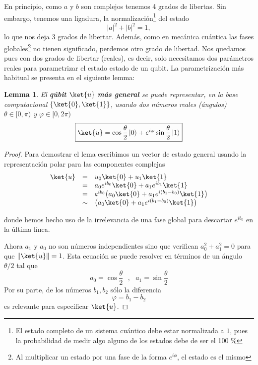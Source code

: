 \documentclass[a4paper,11pt]{book} %
\newtheorem{lemma_contador}{Lemma}
\newcommand{\Lemma}[1]{
		\begin{mybox_gray2}{}
			\begin{lemma_contador}
				 #1 
			\end{lemma_contador} 
		\end{mybox_gray2}
	}
\numberwithin{equation}{chapter}
\begin{document}
En principio, como $a$ y $b$ son complejos tenemos 4 grados de libertas. Sin embargo, tenemos una ligadura, la normalización\footnote{El estado completo de un sistema cuántico debe estar normalizada a $1$, pues la probabilidad de medir algo alguno de los estados debe de ser el 100 \%} del estado
	\begin{equation}
	|a|^2 + |b|^2 = 1,
	\end{equation}
lo que nos deja 3 grados de libertar. Además, como en mecánica cuántica las fases globales\footnote{Al multiplicar un estado por una fase de la forma $e^{i \phi}$, el estado es el mismo} no tienen significado, perdemos otro grado de libertad. Nos quedamos pues con dos grados de libertar (reales), es decir, solo necesitamos dos parámetros reales para parametrizar el estado estado de un qubit. La parametrización más habitual se presenta en el siguiente lemma:

	\Lemma{
	El \textbf{qúbit} $\ket{u}$  \textbf{más general} se puede representar, en la base computacional 
	$\{\ket{0},\ket{1}\}$, usando dos números reales (ángulos) $\theta\in [0,\pi)$ y $\varphi\in [0,2\pi)$   
	\begin{equation} \label{ec_qubit_caso_general}
	\boxed{\ket{u} = \cos{\frac{\theta}{2}}\, |0\rangle + e^{i\varphi}\sin{\frac{\theta}{2}}\,|1\rangle }
	\end{equation}
	}

	\begin{proof}
	Para demostrar el lema escribimos un vector de estado general usando la representación polar para 
	las componentes complejas
    $$
	\begin{array}{rcl}
	\ket{u} &=& u_0\ket{0} + u_1\ket{1} \\
	&=& a_0 e^{i b_0}\ket{0} + a_1 e^{ib_1}\ket{1}\\
	&=& e^{i b_0}\big(a_0 \ket{0} + a_1 e^{i(b_1-b_0)}\ket{1}\big)\\
	&\sim & \big( a_0 \ket{0} + a_1 e^{i(b_1-b_0)}\ket{1} \big)
	\end{array}
	$$
    
	donde hemos hecho uso de la irrelevancia de una fase global para descartar $e^{i b_0}$ en la última línea.

	Ahora $a_1$ y $a_0$ no son números independientes sino que verifican $a_0^2 + a_1^2 = 0$ para que 
	$\|\ket{u}\|=1$. Esta ecuación se puede resolver en términos de un ángulo $\theta/2$ tal que
	$$
	a_0 = \cos\frac{\theta}{2}~~~,~~~ a_1 = \sin\frac{\theta}{2} 
	$$
	Por su parte, de los números $b_1, b_2$ sólo la diferencia
	$$
	\varphi = b_1-b_2
	$$
	es relevante para especificar $\ket{u}$. 
	\end{proof}
  
\end{document}
